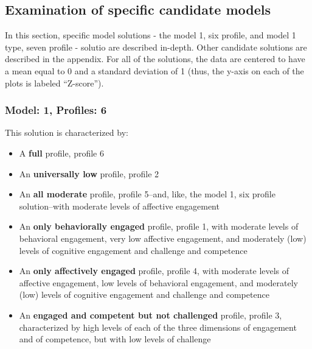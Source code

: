 \documentclass[]{book}
\providecommand{\tightlist}{%
  \setlength{\itemsep}{0pt}\setlength{\parskip}{0pt}}
\theoremstyle{definition}
\theoremstyle{definition}
\theoremstyle{definition}
\theoremstyle{remark}
\begin{document}
\subsection{Examination of specific candidate
models}\label{examination-of-specific-candidate-models}

In this section, specific model solutions - the model 1, six profile,
and model 1 type, seven profile - solutio are described in-depth. Other
candidate solutions are described in the appendix. For all of the
solutions, the data are centered to have a mean equal to 0 and a
standard deviation of 1 (thus, the y-axis on each of the plots is
labeled ``Z-score'').

\subsubsection{Model: 1, Profiles: 6}\label{model-1-profiles-6}

This solution is characterized by:

\begin{itemize}
\tightlist
\item
  A \textbf{full} profile, profile 6
\item
  An \textbf{universally low} profile, profile 2
\item
  An \textbf{all moderate} profile, profile 5--and, like, the model 1,
  six profile solution--with moderate levels of affective engagement
\item
  An \textbf{only behaviorally engaged} profile, profile 1, with
  moderate levels of behavioral engagement, very low affective
  engagement, and moderately (low) levels of cognitive engagement and
  challenge and competence
\item
  An \textbf{only affectively engaged} profile, profile 4, with moderate
  levels of affective engagement, low levels of behavioral engagement,
  and moderately (low) levels of cognitive engagement and challenge and
  competence
\item
  An \textbf{engaged and competent but not challenged} profile, profile
  3, characterized by high levels of each of the three dimensions of
  engagement and of competence, but with low levels of challenge
\end{itemize}
\end{document}
